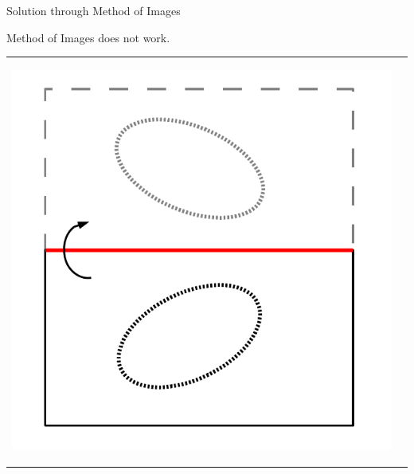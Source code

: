 \documentclass{beamer}
\begin{document}
\begin{frame}{Solution through Method of Images}
 
{\color{red} Method of Images does not work.}
\vspace{10mm}

\begin{tabular}{cc}
\begin{minipage}{5cm}
\begin{center}
\includegraphics[scale=0.5,angle=0]{./section-3-figures/unmodified-reflection.pdf}
\end{center}
\end{minipage}
&
\begin{minipage}{5cm}
\begin{center}

\end{center}
\end{minipage}
\end{tabular}
\end{frame}
\end{document}
